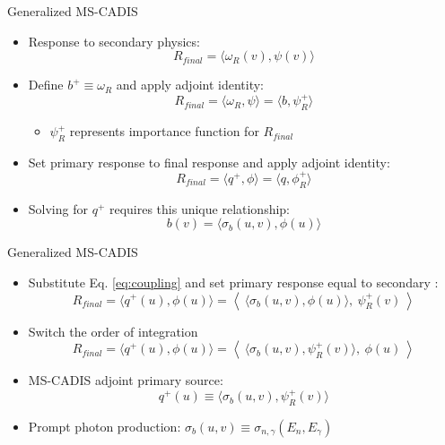 \documentclass{beamer}
\begin{document}
\begin{frame}{Generalized MS-CADIS}
\begin{itemize}
\item{Response to secondary physics:}
\begin{equation} \label{eq:response}
  R_{final} = \langle \omega_R(v), \psi(v) \rangle
\end{equation}
\item{Define  $b^+ \equiv \omega_R$ and apply adjoint
	identity:}
\begin{equation}
  R_{final} = \langle \omega_R, \psi \rangle = \langle b, \psi_R^{+}\rangle
\end{equation}
		\vspace{-0.4cm}          
		\begin{itemize}
		\item{$\psi_R^+$ represents importance function for $R_{final}$}
		\end{itemize}
		\vspace{0.4cm}          
\item{Set primary response to final response and apply adjoint
	identity:}
	\begin{equation}
		R_{final} = \langle q^+, \phi \rangle
		          = \langle q, \phi_R^+ \rangle
	\end{equation}
\item{Solving for $q^+$ requires this unique relationship:}
          \begin{equation}\label{eq:coupling}
            b(v) = \langle \sigma_b(u,v), \phi(u) \rangle
          \end{equation}


\end{itemize}
\end{frame}

\begin{frame}{Generalized MS-CADIS}
\begin{itemize}
\item{Substitute Eq. \ref{eq:coupling} and set primary response equal to secondary :}
\begin{equation}
	R_{final} = \langle q^+(u), \phi(u) \rangle
	=\left \langle\  \langle \sigma_b(u,v) , \phi(u) \rangle,\
	\psi_R^{+}(v) \ \right\rangle
\end{equation}
	\item{Switch the order of integration}
\begin{equation}\label{eq:pseudo-response}
	R_{final} = \langle q^+(u), \phi(u) \rangle
	=\left \langle \ \langle \sigma_b(u,v) , \psi_R^{+}(v) \rangle,\
	\phi(u) \ \right\rangle
\end{equation}
		\vspace{0.2cm}
\item{MS-CADIS adjoint primary source:}
\begin{equation}
  q^{+}(u) \equiv \langle \sigma_b(u,v) , \psi_R^{+}(v) \rangle
\end{equation}
		\vspace{0.2cm}
\item{Prompt photon production: $\sigma_b(u,v) \equiv \sigma_{n,\gamma}(E_n,
	E_{\gamma})$}
\end{itemize}
\end{frame}
\end{document}
